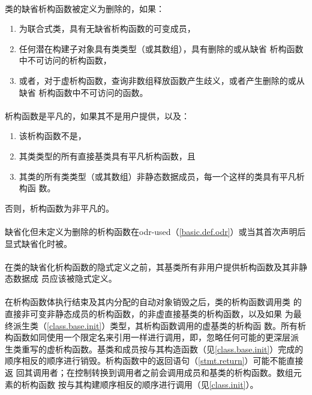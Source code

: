\paragraph{}
类的缺省析构函数被定义为删除的，如果：
\begin{enumerate}
  \item{为联合式类，具有无缺省析构函数的可变成员，}
  \item{任何潜在构建子对象具有类类型（或其数组），具有删除的或从缺省
    析构函数中不可访问的析构函数，}
  \item{或者，对于虚析构函数，查询非数组释放函数产生歧义，或者产生删除的或从缺省
    析构函数中不可访问的函数。}
\end{enumerate}

\paragraph{}
析构函数是平凡的，如果其不是用户提供，以及：
\begin{enumerate}
  \item{该析构函数不是，}
  \item{其类类型的所有直接基类具有平凡析构函数，且}
  \item{其类的所有类类型（或其数组）非静态数据成员，每一个这样的类具有平凡析构函
    数。}
\end{enumerate}
否则，析构函数为非平凡的。

\paragraph{}
缺省化但未定义为删除的析构函数在odr-used（\ref{basic.def.odr}）或当其首次声明后
显式缺省化时被。

\paragraph{}
在类的缺省化析构函数的隐式定义之前，其基类所有非用户提供析构函数及其非静态数据成
员应该被隐式定义。

\paragraph{}
在析构函数体执行结束及其内分配的自动对象销毁之后，类的析构函数调用类
的直接非可变非静态成员的析构函数，的非虚直接基类的析构函数，以及如果
为最终派生类（\ref{class.base.init}）类型，其析构函数调用的虚基类的析构函
数。所有析构函数如同使用一个限定名来引用一样进行调用，即，忽略任何可能的更深层派
生类重写的虚析构函数。基类和成员按与其构造函数（见\ref{class.base.init}）完成的
顺序相反的顺序进行销毁。析构函数中的返回语句（\ref{stmt.return}）可能不能直接返
回其调用者；在控制转换到调用者之前会调用成员和基类的析构函数。数组元素的析构函数
按与其构建顺序相反的顺序进行调用（见\ref{class.init}）。

